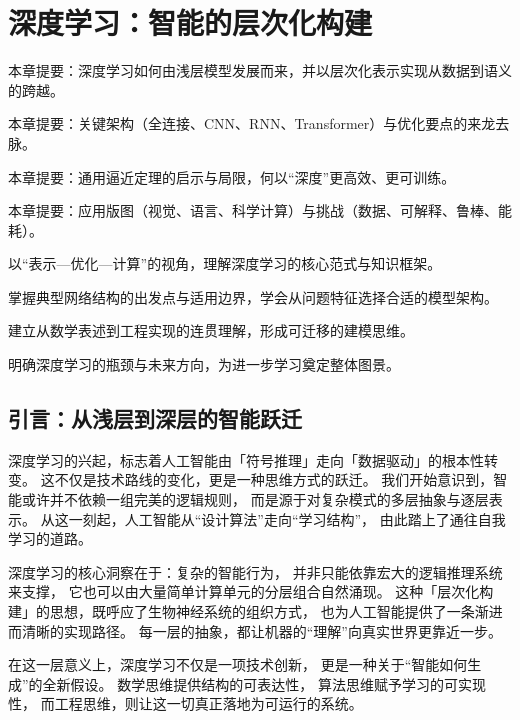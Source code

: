 \chapter{深度学习：智能的层次化构建}

\begin{introduction}
  \item 本章提要：深度学习如何由浅层模型发展而来，并以层次化表示实现从数据到语义的跨越。
  \item 本章提要：关键架构（全连接、CNN、RNN、Transformer）与优化要点的来龙去脉。
  \item 本章提要：通用逼近定理的启示与局限，何以“深度”更高效、更可训练。
  \item 本章提要：应用版图（视觉、语言、科学计算）与挑战（数据、可解释、鲁棒、能耗）。
\end{introduction}

\begin{introduction}
  \item 以“表示—优化—计算”的视角，理解深度学习的核心范式与知识框架。
  \item 掌握典型网络结构的出发点与适用边界，学会从问题特征选择合适的模型架构。
  \item 建立从数学表述到工程实现的连贯理解，形成可迁移的建模思维。
  \item 明确深度学习的瓶颈与未来方向，为进一步学习奠定整体图景。
\end{introduction}

\section{引言：从浅层到深层的智能跃迁}

深度学习的兴起，标志着人工智能由「符号推理」走向「数据驱动」的根本性转变。  
这不仅是技术路线的变化，更是一种思维方式的跃迁。  
我们开始意识到，智能或许并不依赖一组完美的逻辑规则，  
而是源于对复杂模式的多层抽象与逐层表示。  
从这一刻起，人工智能从“设计算法”走向“学习结构”，  
由此踏上了通往自我学习的道路。

深度学习的核心洞察在于：复杂的智能行为，  
并非只能依靠宏大的逻辑推理系统来支撑，  
它也可以由大量简单计算单元的分层组合自然涌现。  
这种「层次化构建」的思想，既呼应了生物神经系统的组织方式，  
也为人工智能提供了一条渐进而清晰的实现路径。  
每一层的抽象，都让机器的“理解”向真实世界更靠近一步。  

在这一层意义上，深度学习不仅是一项技术创新，  
更是一种关于“智能如何生成”的全新假设。  
数学思维提供结构的可表达性，  
算法思维赋予学习的可实现性，  
而工程思维，则让这一切真正落地为可运行的系统。

